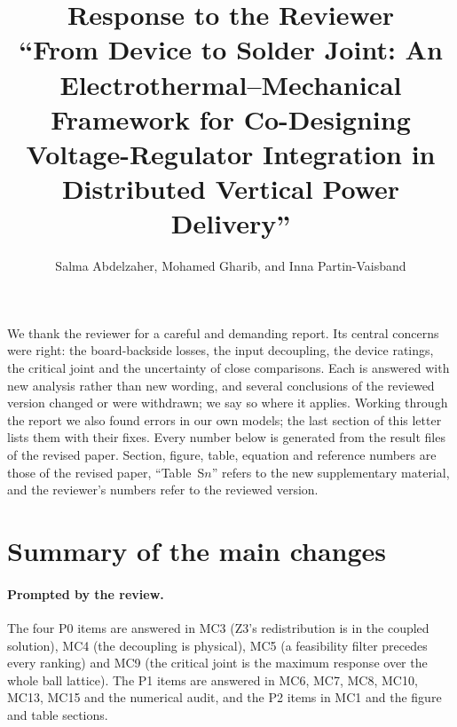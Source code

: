 \documentclass[10pt]{article}
\title{Response to the Reviewer\\[2pt]\large ``From Device to Solder Joint: An
Electrothermal--Mechanical Framework for Co-Designing Voltage-Regulator Integration in
Distributed Vertical Power Delivery''}
\author{Salma Abdelzaher, Mohamed Gharib, and Inna Partin-Vaisband}
\date{}
\begin{document}
\maketitle

We thank the reviewer for a careful and demanding report. Its central concerns were right: the
board-backside losses, the input decoupling, the device ratings, the critical joint and the
uncertainty of close comparisons. Each is answered with new analysis rather than new wording, and
several conclusions of the reviewed version changed or were withdrawn; we say so where it applies.
Working through the report we also found errors in our own models; the last section of this letter
lists them with their fixes. Every number below is generated from the result files of the revised
paper. Section, figure, table, equation and reference numbers are those of the revised paper,
``Table~S$n$'' refers to the new supplementary material, and the reviewer's numbers refer to the
reviewed version.

\section*{Summary of the main changes}
\paragraph{Prompted by the review.} The four P0 items are answered in MC3 (Z3's redistribution is in
the coupled solution), MC4 (the decoupling is physical), MC5 (a feasibility filter precedes every
ranking) and MC9 (the critical joint is the maximum response over the whole ball lattice). The P1
items are answered in MC6, MC7, MC8, MC10, MC13, MC15 and the numerical audit, and the P2 items in
MC1 and the figure and table sections.
\end{document}
